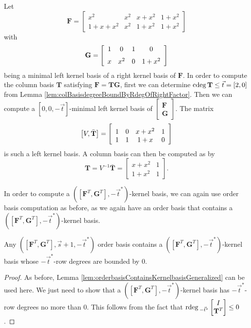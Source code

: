 \begin{exmp}
Let 
\[
\mathbf{F}=\left[\begin{array}{cccc}
x^{2} & x^{2} & x+x^{2} & 1+x^{2}\\
1+x+x^{2} & x^{2} & 1+x^{2} & 1+x^{2}
\end{array}\right]
\]
with 
\[
\mathbf{G}=\left[\begin{array}{cccc}
1 & 0 & 1 & 0\\
\noalign{\medskip}x & {x}^{2} & 0 & 1+{x}^{2}
\end{array}\right]
\]
being a minimal left kernel basis of a right kernel basis of $\mathbf{F}$.
In order to compute the column basis $\mathbf{T}$ satisfying $\mathbf{F}=\mathbf{T}\mathbf{G}$,
first we can determine ${\rm cdeg}\,\mathbf{T}\le\vec{t}=\left[2,0\right]$
from Lemma \ref{lem:colBasisdegreeBoundByRdegOfRightFactor}. Then
we can compute a $\left[0,0,-\vec{t}\right]$-minimal left kernel
basis of $\begin{bmatrix}\mathbf{F}\\
\mathbf{G}
\end{bmatrix}$. The matrix 
\[
\left[V,\bar{\mathbf{T}}\right]=\left[\begin{array}{cccc}
\noalign{\medskip}1 & 0 & x+{x}^{2} & 1\\
1 & 1 & 1+x & 0
\end{array}\right]
\]
is such a left kernel basis. A column basis can then be computed as
by 
\[
\mathbf{T}=V^{-1}\bar{\mathbf{T}}=\left[\begin{array}{cc}
x+x^{2} & 1\\
1+{x}^{2} & 1
\end{array}\right].
\]

\end{exmp}
In order to compute a $\left(\left[\mathbf{F}^{T},\mathbf{G}^{T}\right],-\vec{t}^{*}\right)$-kernel
basis, we can again use order basis computation as before, as we again
have an order basis that contains a $\left(\left[\mathbf{F}^{T},\mathbf{G}^{T}\right],-\vec{t}^{*}\right)$-kernel
basis.
\begin{lem}
Any $\left(\left[\mathbf{F}^{T},\mathbf{G}^{T}\right],\vec{s}+1,-\vec{t}^{*}\right)$
order basis contains a $\left(\left[\mathbf{F}^{T},\mathbf{G}^{T}\right],-\vec{t}^{*}\right)$-kernel
basis whose $-\vec{t}^{*}$-row degrees are bounded by 0. 
\end{lem}
\begin{proof}
As before, Lemma \ref{lem:orderbasisContainsKernelbasisGeneralized}
can be used here. We just need to show that a $\left(\left[\mathbf{F}^{T},\mathbf{G}^{T}\right],-\vec{t}^{*}\right)$-kernel
basis has $-\vec{t}^{*}$-row degrees no more than $0$. This follows
from the fact that ${\rm rdeg}\,_{-\vec{t}^{*}}\begin{bmatrix}I\\
\mathbf{T}^{T}
\end{bmatrix}\le0$. 
\end{proof}

